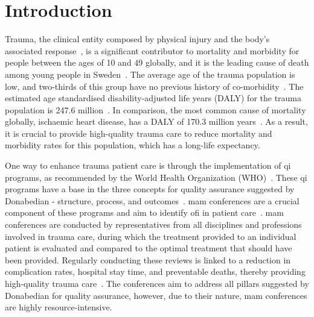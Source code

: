 \documentclass[12pt, a4paper]{article}
\begin{document}
\newpage

\normalsize

\glsaddall
\printnoidxglossary[type=acronym,style=csuper]

\newpage


\section{Introduction}
Trauma, the clinical entity composed by physical injury and the body's associated response~\cite{gerdin_risk_2015}, is
a significant contributor to mortality and morbidity for people between the ages of 10 and 49 globally, and it is the
leading cause of death among young people in Sweden~\cite{roth_global_2018, vos_global_2020, sos_death_2021}. The
average age of the trauma population is low, and two-thirds of this group have no previous history of
co-morbidity~\cite{brattstrom_socio-economic_2015}. The estimated age standardised disability-adjusted life years
(DALY) for the trauma population is 247.6 million~\cite{haagsma_global_2016}. In comparison, the most common cause of
mortality globally, ischaemic heart disease, has a DALY of 170.3 million
years~\cite{wang_global_2021,roth_global_2018}. As a result, it is crucial to provide high-quality trauma care to
reduce mortality and morbidity rates for this population, which has a long-life expectancy.

One way to enhance trauma patient care is through the implementation of \acrfull{qi} programs, as recommended by the
World Health Organization (WHO)~\cite{world_health_organization_guidelines_2009}. These \acrshort{qi} programs have a
base in the three concepts for quality assurance suggested by Donabedian - structure, process, and
outcomes~\cite{donabedian_effectiveness_1996}. \Acrfull{mam} conferences are a crucial component of these programs and
aim to identify \acrfull{ofi} in patient care~\cite{santana_development_2014}. \acrshort{mam} conferences are conducted
by representatives from all disciplines and professions involved in trauma care, during which the treatment provided to
an individual patient is evaluated and compared to the optimal treatment that should have been provided. Regularly
conducting these reviews is linked to a reduction in complication rates, hospital stay time, and preventable deaths,
thereby providing high-quality trauma care~\cite{stelfox_evidence_2011, mcdermott_trauma_1994}. The conferences aim to
address all pillars suggested by Donabedian for quality assurance, however, due to their nature, \acrshort{mam}
conferences are highly resource-intensive.
\end{document}
